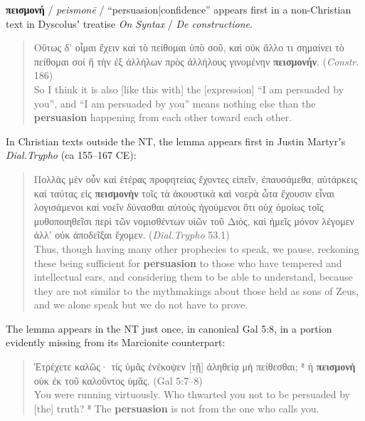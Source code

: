 \noindent{}\textbf{πεισμονή} / \textit{peismonē} / “persuasion|confidence” appears first in a non-Christian %
text in Dyscolusʼ treatise \textit{On Syntax} / \textit{De constructione}. %

\vspace*{2mm} 
 \begin{quote}Οὕτως δ’ οἶμαι ἔχειν καὶ τὸ πείθομαι ὑπὸ σοῦ, %
 καὶ οὐκ ἄλλο τι σημαίνει τὸ πείθομαι σοί %
 ἢ τὴν ἐξ ἀλλήλων πρὸς ἀλλήλους γινομένην \textbf{πεισμονήν}. (\textit{Constr}. 186)\\[1mm] %
 So I think it is also [like this with] the [expression] “I am persuaded by you”, %
 and “I am persuaded by you” means nothing else %
 than the \textbf{persuasion} happening from each other toward each other.\end{quote} %
 \vspace*{2mm}

In Christian texts outside the NT, %
the lemma appears first in Justin Martyrʼs \textit{Dial.Trypho} (ca 155--167 CE): %

\vspace*{2mm} 
 \begin{quote}Πολλὰς μὲν οὖν καὶ ἑτέρας προφητείας ἔχοντες εἰπεῖν, ἐπαυσάμεθα, %
 αὐτάρκεις καὶ ταύτας εἰς \textbf{πεισμονὴν} τοῖς τὰ ἀκουστικὰ καὶ νοερὰ ὦτα %
 ἔχουσιν εἶναι λογισάμενοι καὶ νοεῖν δύνασθαι αὐτοὺς ἡγούμενοι ὅτι οὐχ %
 ὁμοίως τοῖς μυθοποιηθεῖσι περὶ τῶν νομισθέντων υἱῶν τοῦ Διὸς, %
 καὶ ἡμεῖς μόνον λέγομεν ἀλλ’ οὐκ ἀποδεῖξαι ἔχομεν. (\textit{Dial.Trypho} 53.1) \\[1mm] %
 Thus, though having many other prophecies to speak, we pause, %
 reckoning these being sufficient for \textbf{persuasion} to those who have tempered and intellectual ears, %
 and considering them to be able to understand, %
 because they are not similar to the mythmakings about those held as sons of Zeus, %
 and we alone speak but we do not have to prove. \end{quote} %
 \clearpage

The lemma appears in the NT just once, %
in canonical Gal 5:8, in a portion evidently missing from its Marcionite counterpart: %

\vspace*{2mm} 
 \begin{quote}Ἐτρέχετε καλῶς· τίς ὑμᾶς ἐνέκοψεν [τῇ] ἀληθείᾳ μὴ πείθεσθαι; %
 ⁸ ἡ \textbf{πεισμονὴ} οὐκ ἐκ τοῦ καλοῦντος ὑμᾶς. (Gal 5:7--8) \\[1mm] %
 You were running virtuously. Who thwarted you not to be persuaded by [the] truth? %
 ⁸ The \textbf{persuasion} is not from the one who calls you. %
 \end{quote} %
 \vspace*{2mm} 


